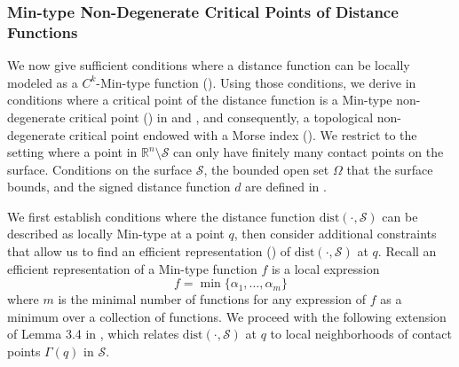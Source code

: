\documentclass[11pt]{article}
\newcommand{\R}{\mathbb{R}}
\newcommand{\W}{\Omega}
\newcommand{\dist}{\mathrm{dist}}
\newcommand{\Surf}{\mathcal{S}}
\theoremstyle{plain}
\theoremstyle{definition}
\theoremstyle{remark}
\begin{document}
\subsubsection{Min-type Non-Degenerate Critical Points of Distance Functions}
\label{sec:NDG_crit_pts_dist_functions}

We now give sufficient conditions where a distance function can be locally modeled as a $C^k$-Min-type function (). Using those conditions, we derive in conditions where a critical point of the distance function is a Min-type non-degenerate critical point () in  and , and consequently, a topological non-degenerate critical point endowed with a Morse index (). We restrict to the setting where a point in $\R^n \setminus \Surf$ can only have finitely many contact points on the surface. Conditions on the surface $\Surf$, the bounded open set $\W$ that the surface bounds, and the signed distance function $d$ are defined in . 


We first establish conditions where the distance function $\dist(\cdot, \Surf)$ can be described as locally Min-type at a point $q$, then consider additional constraints that allow us to find an efficient representation () of $\dist(\cdot, \Surf)$ at $q$. Recall an efficient representation of a Min-type function $f$ is a local expression
\[ f = \min \{\alpha_1, \ldots,  \alpha_m\}\]
where $m$ is the minimal number of functions for any expression of $f$ as a minimum over a collection of functions. We proceed with the following extension of Lemma 3.4 in \cite{birbrair_medial_2017}, which relates $\dist(\cdot, \Surf)$ at $q$ to local neighborhoods of contact points $\Gamma(q)$ in $\Surf$.
\end{document}
